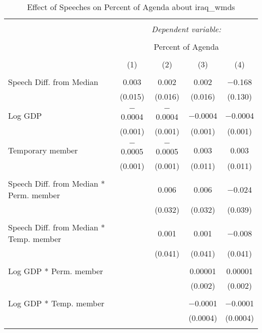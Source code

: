 
\begin{table}[!htbp] \centering 
  \caption{Effect of Speeches on Percent of Agenda about  iraq_wmds} 
  \label{} 
\begin{tabular}{@{\extracolsep{5pt}}lcccc} 
\\[-1.8ex]\hline 
\hline \\[-1.8ex] 
 & \multicolumn{4}{c}{\textit{Dependent variable:}} \\ 
\cline{2-5} 
\\[-1.8ex] & \multicolumn{4}{c}{Percent of Agenda} \\ 
\\[-1.8ex] & (1) & (2) & (3) & (4)\\ 
\hline \\[-1.8ex] 
 Speech Diff. from Median & 0.003 & 0.002 & 0.002 & $-$0.168 \\ 
  & (0.015) & (0.016) & (0.016) & (0.130) \\ 
  & & & & \\ 
 Log GDP & $-$0.0004 & $-$0.0004 & $-$0.0004 & $-$0.0004 \\ 
  & (0.001) & (0.001) & (0.001) & (0.001) \\ 
  & & & & \\ 
 Temporary member & $-$0.0005 & $-$0.0005 & 0.003 & 0.003 \\ 
  & (0.001) & (0.001) & (0.011) & (0.011) \\ 
  & & & & \\ 
 Speech Diff. from Median * Perm. member &  & 0.006 & 0.006 & $-$0.024 \\ 
  &  & (0.032) & (0.032) & (0.039) \\ 
  & & & & \\ 
 Speech Diff. from Median * Temp. member &  & 0.001 & 0.001 & $-$0.008 \\ 
  &  & (0.041) & (0.041) & (0.041) \\ 
  & & & & \\ 
 Log GDP * Perm. member &  &  & 0.00001 & 0.00001 \\ 
  &  &  & (0.002) & (0.002) \\ 
  & & & & \\ 
 Log GDP * Temp. member &  &  & $-$0.0001 & $-$0.0001 \\ 
  &  &  & (0.0004) & (0.0004) \\ 
  & & & & \\ 

\end{tabular}
\end{table}
